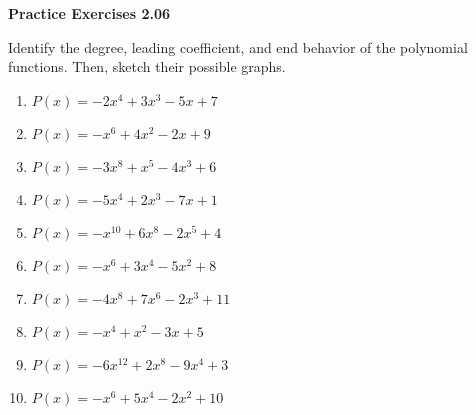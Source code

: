 \vspace{0.3ex}
\noindent\textbf{Practice Exercises 2.06}

\vspace{0.2ex}

Identify the degree, leading coefficient, and end behavior of the polynomial functions. Then, sketch their possible graphs.
\begin{multicols}{2}
\begin{enumerate}
    \item \( P(x) = -2x^4 + 3x^3 - 5x + 7 \)
    \item \( P(x) = -x^6 + 4x^2 - 2x + 9 \)
    \item \( P(x) = -3x^8 + x^5 - 4x^3 + 6 \)
    \item \( P(x) = -5x^4 + 2x^3 - 7x + 1 \)
    \item \( P(x) = -x^{10} + 6x^8 - 2x^5 + 4 \)
    \item \( P(x) = -x^6 + 3x^4 - 5x^2 + 8 \)
    \item \( P(x) = -4x^8 + 7x^6 - 2x^3 + 11 \)
    \item \( P(x) = -x^4 + x^2 - 3x + 5 \)
    \item \( P(x) = -6x^12 + 2x^8 - 9x^4 + 3 \)
    \item \( P(x) = -x^6 + 5x^4 - 2x^2 + 10 \)
\end{enumerate}
\end{multicols}
